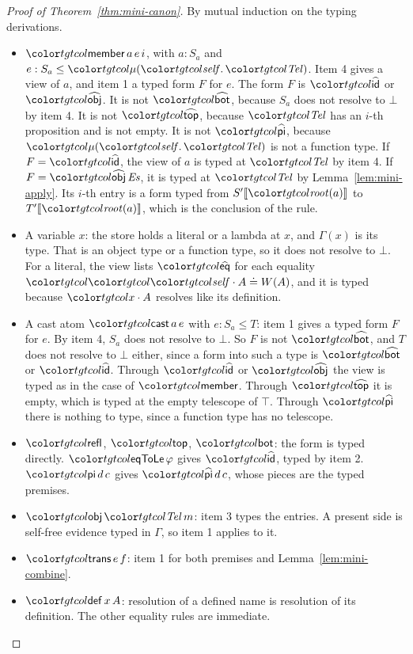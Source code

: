 \begin{proof}[Proof of Theorem~\ref{thm:mini-canon}]
By mutual induction on the typing derivations.
\begin{itemize}
\item $\ev{member}\,a\,e\,i$, with $a : S_a$ and $e : S_a \le \obj{\tel}$. Item 4 gives a view of $a$, and item 1 a typed form $F$ for $e$. The form $F$ is $\form{id}$ or $\form{obj}$. It is not $\form{bot}$, because $S_a$ does not resolve to $\bot$ by item 4. It is not $\form{top}$, because $\tel$ has an $i$-th proposition and is not empty. It is not $\form{pi}$, because $\obj{\tel}$ is not a function type. If $F = \form{id}$, the view of $a$ is typed at $\tel$ by item 4. If $F = \form{obj}\,\mathit{Es}$, it is typed at $\tel$ by Lemma~\ref{lem:mini-apply}. Its $i$-th entry is a form typed from $\inst{S'}{\rt{a}}$ to $\inst{T'}{\rt{a}}$, which is the conclusion of the rule.
\item A variable $x$: the store holds a literal or a lambda at $x$, and $\Gamma(x)$ is its type. That is an object type or a function type, so it does not resolve to $\bot$. For a literal, the view lists $\form{eq}$ for each equality $\peq{\sel{\self}{A}}{W(A)}$, and it is typed because $\sel{x}{A}$ resolves like its definition.
\item A cast atom $\ev{cast}\,a\,e$ with $e : S_a \le T$: item 1 gives a typed form $F$ for $e$. By item 4, $S_a$ does not resolve to $\bot$. So $F$ is not $\form{bot}$, and $T$ does not resolve to $\bot$ either, since a form into such a type is $\form{bot}$ or $\form{id}$. Through $\form{id}$ or $\form{obj}$ the view is typed as in the case of $\ev{member}$. Through $\form{top}$ it is empty, which is typed at the empty telescope of $\top$. Through $\form{pi}$ there is nothing to type, since a function type has no telescope.
\item $\ev{refl}$, $\ev{top}$, $\ev{bot}$: the form is typed directly. $\ev{eqToLe}\,\varphi$ gives $\form{id}$, typed by item 2. $\ev{pi}\,d\,c$ gives $\form{pi}\,d\,c$, whose pieces are the typed premises.
\item $\ev{obj}\,\tel\,m$: item 3 types the entries. A present side is self-free evidence typed in $\Gamma$, so item 1 applies to it.
\item $\ev{trans}\,e\,f$: item 1 for both premises and Lemma~\ref{lem:mini-combine}.
\item $\ev{def}\,x\,A$: resolution of a defined name is resolution of its definition. The other equality rules are immediate. \qedhere
\end{itemize}
\end{proof}

